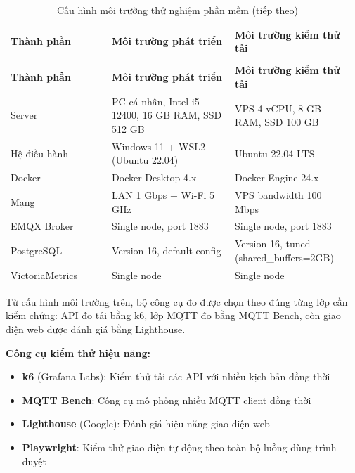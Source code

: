 \documentclass[a4paper]{extarticle}
\newcommand{\thesissettableid}[2]{%
  \renewcommand{\thetable}{#1}%
  \renewcommand{\theHtable}{#2}%
}
\providecommand{\tightlist}{%
  \setlength{\itemsep}{0pt}\setlength{\parskip}{0pt}}
\begin{document}
{\thesissettableid{4.13}{tab-ch4-cau-hinh-moi-truong-thu-nghiem-phan-mem}
\def\LTcaptype{table}
\begin{longtable}{|L{0.287\linewidth}|L{0.344\linewidth}|L{0.334\linewidth}|}
\caption{Cấu hình môi trường thử nghiệm phần mềm}\label{tab:ch4-cau-hinh-moi-truong-thu-nghiem-phan-mem}\\
\hline \textbf{Thành phần} & \textbf{Môi trường phát triển} & \textbf{Môi trường kiểm thử tải} \\
\hline
\endfirsthead
\caption[]{Cấu hình môi trường thử nghiệm phần mềm (tiếp theo)}\\
\hline \textbf{Thành phần} & \textbf{Môi trường phát triển} & \textbf{Môi trường kiểm thử tải} \\
\hline
\endhead
\hline
\endfoot
\endlastfoot
Server & PC cá nhân, Intel i5--12400, 16 GB RAM, SSD 512 GB & VPS 4
vCPU, 8 GB RAM, SSD 100 GB \\\hline
Hệ điều hành & Windows 11 + WSL2 (Ubuntu 22.04) & Ubuntu 22.04 LTS \\\hline
Docker & Docker Desktop 4.x & Docker Engine 24.x \\\hline
Mạng & LAN 1 Gbps + Wi-Fi 5 GHz & VPS bandwidth 100 Mbps \\\hline
EMQX Broker & Single node, port 1883 & Single node, port 1883 \\\hline
PostgreSQL & Version 16, default config & Version 16, tuned
(shared\_buffers=2GB) \\\hline
VictoriaMetrics & Single node & Single node \\\hline
\end{longtable}
}

Từ cấu hình môi trường trên, bộ công cụ đo được chọn theo đúng từng lớp
cần kiểm chứng: API đo tải bằng k6, lớp MQTT đo bằng MQTT Bench, còn
giao diện web được đánh giá bằng Lighthouse.


\textbf{Công cụ kiểm thử hiệu năng:}

\begin{itemize}
\tightlist
\item
  \textbf{k6} (Grafana Labs): Kiểm thử tải các API với nhiều kịch
  bản đồng thời
\item
  \textbf{MQTT Bench}: Công cụ mô phỏng nhiều MQTT client đồng thời
\item
  \textbf{Lighthouse} (Google): Đánh giá hiệu năng giao diện web
\item
  \textbf{Playwright}: Kiểm thử giao diện tự động theo toàn bộ luồng dùng
  trình duyệt
\end{itemize}
\end{document}
